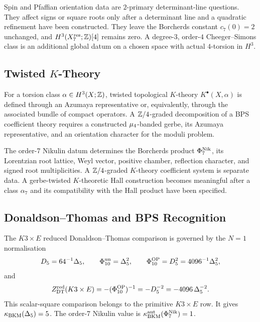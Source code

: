 Spin and Pfaffian orientation data are \(2\)-primary determinant-line
questions.  They affect signs or square roots only after a determinant
line and a quadratic refinement have been constructed.  They leave the
Borcherds constant \(c_7(0)=2\) unchanged, and
\(H^3(X_7^{\mathrm{res}};\mathbb{Z})[4]\) remains zero.  A
degree-\(3\), order-\(4\) Cheeger--Simons class is an additional global
datum on a chosen space with actual \(4\)-torsion in \(H^3\).

\subsection*{Twisted \texorpdfstring{\(K\)}{K}-Theory}

For a torsion class \(\alpha\in H^3(X;\mathbb{Z})\), twisted topological
\(K\)-theory \(K^\bullet(X,\alpha)\) is defined through an Azumaya
representative or, equivalently, through the associated bundle of
compact operators.  A \(\mathbb{Z}/4\)-graded decomposition of a BPS
coefficient theory requires a constructed \(\mu_{4}\)-banded gerbe,
its Azumaya representative, and an orientation character for the
moduli problem.

The order-7 Nikulin datum determines the Borcherds product \(\Phi_{7}^{\mathrm{Nik}}\),
its Lorentzian root lattice, Weyl vector, positive chamber, reflection
character, and signed root multiplicities.  A \(\mathbb{Z}/4\)-graded
\(K\)-theory coefficient system is separate data.  A gerbe-twisted
\(K\)-theoretic Hall construction becomes meaningful after a class
\(\alpha_7\) and its compatibility with the Hall product have been
specified.

\subsection*{Donaldson--Thomas and BPS Recognition}

The \(K3\times E\) reduced Donaldson--Thomas comparison is governed by
the \(N=1\) normalisation
\[
  D_5=64^{-1}\Delta_{5},\qquad
  \Phi_{10}^{\mathrm{un}}=\Delta_{5}^2,\qquad
  \Phi_{10}^{\mathrm{OP}}=D_5^2=4096^{-1}\Delta_{5}^2,
\]
and
\[
  Z^{\mathrm{red}}_{\mathrm{DT}}(K3\times E)=
  -(\Phi_{10}^{\mathrm{OP}})^{-1}
  =
  -D_5^{-2}
  =
  -4096\,\Delta_{5}^{-2}.
\]
This scalar-square comparison belongs to the primitive \(K3\times E\)
row.  It gives \(\kappa_{\mathrm{BKM}}(\Delta_{5})=5\).  The order-7 Nikulin value is
\(\kappa_{\mathrm{BKM}}^{\mathrm{aut}}(\Phi_{7}^{\mathrm{Nik}})=1\).

